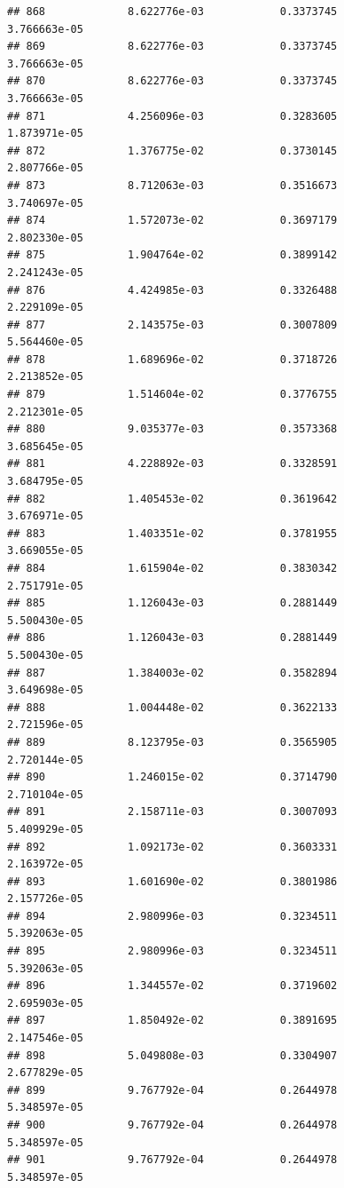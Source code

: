 \documentclass[
]{article}
\begin{document}
\begin{verbatim}
## 868             8.622776e-03            0.3373745            3.766663e-05
## 869             8.622776e-03            0.3373745            3.766663e-05
## 870             8.622776e-03            0.3373745            3.766663e-05
## 871             4.256096e-03            0.3283605            1.873971e-05
## 872             1.376775e-02            0.3730145            2.807766e-05
## 873             8.712063e-03            0.3516673            3.740697e-05
## 874             1.572073e-02            0.3697179            2.802330e-05
## 875             1.904764e-02            0.3899142            2.241243e-05
## 876             4.424985e-03            0.3326488            2.229109e-05
## 877             2.143575e-03            0.3007809            5.564460e-05
## 878             1.689696e-02            0.3718726            2.213852e-05
## 879             1.514604e-02            0.3776755            2.212301e-05
## 880             9.035377e-03            0.3573368            3.685645e-05
## 881             4.228892e-03            0.3328591            3.684795e-05
## 882             1.405453e-02            0.3619642            3.676971e-05
## 883             1.403351e-02            0.3781955            3.669055e-05
## 884             1.615904e-02            0.3830342            2.751791e-05
## 885             1.126043e-03            0.2881449            5.500430e-05
## 886             1.126043e-03            0.2881449            5.500430e-05
## 887             1.384003e-02            0.3582894            3.649698e-05
## 888             1.004448e-02            0.3622133            2.721596e-05
## 889             8.123795e-03            0.3565905            2.720144e-05
## 890             1.246015e-02            0.3714790            2.710104e-05
## 891             2.158711e-03            0.3007093            5.409929e-05
## 892             1.092173e-02            0.3603331            2.163972e-05
## 893             1.601690e-02            0.3801986            2.157726e-05
## 894             2.980996e-03            0.3234511            5.392063e-05
## 895             2.980996e-03            0.3234511            5.392063e-05
## 896             1.344557e-02            0.3719602            2.695903e-05
## 897             1.850492e-02            0.3891695            2.147546e-05
## 898             5.049808e-03            0.3304907            2.677829e-05
## 899             9.767792e-04            0.2644978            5.348597e-05
## 900             9.767792e-04            0.2644978            5.348597e-05
## 901             9.767792e-04            0.2644978            5.348597e-05

\end{verbatim}
\end{document}
